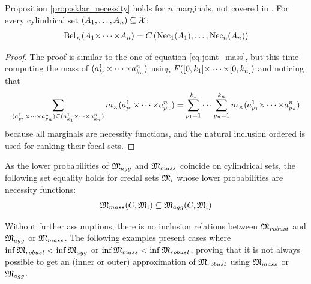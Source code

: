 Proposition \ref{prop:sklar_necessity} holds for $n$ marginals, not covered in \cite{schmelzer_sklars_2015}. For every cylindrical set $(A_1, \dots, A_n)\subseteq{\mathcal{X}}$:
\begin{eqnarray}
    \mathrm{Bel}_\times(A_1{\times\dots\times} A_n) = C\left(\mathrm{Nec}_1(A_1), \dots, \mathrm{Nec}_n(A_n)\right)
\end{eqnarray}

\begin{proof}
    The proof is similar to the one of equation \eqref{eq:joint_mass}, but this time computing the mass of $(a_{k_1}^1{\times\dots\times} a_{k_n}^n)$ using $F([0,k_1]{\times\dots\times}[0,k_n])$ and noticing that \begin{eqnarray*}
        \sum_{(a^1_{p_1}{\times\dots\times} a^n_{p_n})\subseteq(a^1_{k_1}{\times\dots\times} a^n_{k_n})}m_\times(a^1_{p_1}{\times\dots\times} a^n_{p_n})=\sum_{p_1=1}^{k_1}\dots\sum_{p_n=1}^{k_n} m_\times(a^1_{p_1}{\times\dots\times} a^n_{p_n})
    \end{eqnarray*} because all marginals are necessity functions, and the natural inclusion ordered is used for ranking their focal sets.
\end{proof}

As the lower probabilities of ${\mathfrak{M}}_{agg}$ and ${\mathfrak{M}}_{mass}$ coincide on cylindrical sets, the following set equality holds for credal sets ${\mathfrak{M}}_i$ whose lower probabilities are necessity functions:
\begin{eqnarray}\label{eq:inclusion_necessity}
    {\mathfrak{M}}_{mass}(C, {\mathfrak{M}}_i) \subseteq {\mathfrak{M}}_{agg}(C, {\mathfrak{M}}_i)
\end{eqnarray}

Without further assumptions, there is no inclusion relations between ${\mathfrak{M}}_{robust}$ and ${\mathfrak{M}}_{agg}$ or ${\mathfrak{M}}_{mass}$. The following examples present cases where $\inf{\mathfrak{M}}_{robust}<\inf{\mathfrak{M}}_{agg}$ or $\inf{\mathfrak{M}}_{mass}<\inf{\mathfrak{M}}_{robust}$, proving that it is not always possible to get an (inner or outer) approximation of ${\mathfrak{M}}_{robust}$ using ${\mathfrak{M}}_{mass}$ or ${\mathfrak{M}}_{agg}$.


